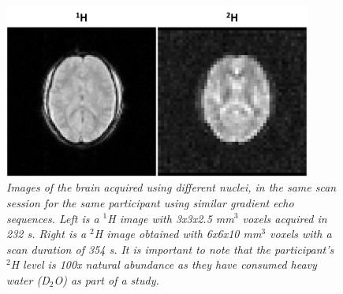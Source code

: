 \begin{figure}[ht]
    \centering
    \includegraphics[width=0.9\textwidth]{Figures/Intro/1H2H_Brain.png}
    \caption{\textit{Images of the brain acquired using different nuclei, in the same scan session for the same participant using similar gradient echo sequences. Left is a $^1$H image with 3\textnormal{x}3\textnormal{x}2.5 mm$^3$ voxels acquired in 232 s. Right is a $^2$H image obtained with 6\textnormal{x}6\textnormal{x}10 mm$^3$ voxels with a scan duration of 354 s. It is important to note that the participant's $^2$H level is 100\textnormal{x} natural abundance as they have consumed heavy water (D$_2$O) as part of a study.}}
    \label{fig:intro:1H2H_Brain}
\end{figure}

